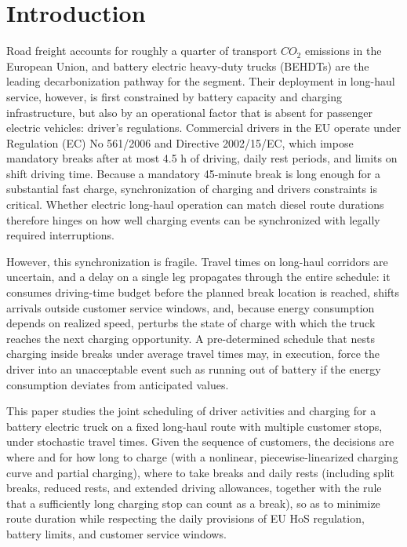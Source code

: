 \documentclass[preprint,12pt,3p]{elsarticle}
\begin{document}





\section{Introduction} \label{intro}
Road freight accounts for roughly a quarter of transport $CO_2$ emissions in the European Union, and battery electric heavy-duty trucks (BEHDTs) are the leading decarbonization pathway for the segment. Their deployment in long-haul  service, however, is first constrained by battery capacity and charging infrastructure, but also by an operational factor that is absent for passenger electric vehicles: driver's regulations. Commercial drivers in the EU operate under Regulation (EC) No 561/2006 and Directive 2002/15/EC, which impose mandatory breaks after at most 4.5 h of driving, daily rest periods, and limits on shift driving time.
Because a mandatory 45-minute break is long enough for a substantial fast charge, synchronization of charging and drivers constraints is critical. Whether electric long-haul operation can match diesel route durations therefore hinges on how well charging events can be synchronized with legally required interruptions.

However, this synchronization is fragile. Travel times on long-haul corridors are uncertain, and a delay on a single leg propagates through the entire schedule: it consumes driving-time budget before the planned break location is reached, shifts arrivals outside customer service windows, and, because energy consumption depends on realized speed, perturbs the state of charge with which the truck reaches the next charging opportunity. A pre-determined schedule that nests charging inside breaks under average travel times may, in execution, force
the driver into an unacceptable event such as running out of battery if the energy consumption deviates from anticipated values.

This paper studies the joint scheduling of driver activities and charging for a battery electric truck on a fixed long-haul route with multiple customer stops, under stochastic travel times. Given the sequence of customers, the decisions are where and for how long to charge (with a nonlinear, piecewise-linearized charging curve and partial charging), where to take breaks and daily rests (including split breaks, reduced rests, and extended driving allowances, together with the rule that a sufficiently long charging stop can count as a break), so as to minimize route duration while respecting the daily provisions of EU HoS regulation, battery limits, and customer service windows.
\end{document}
